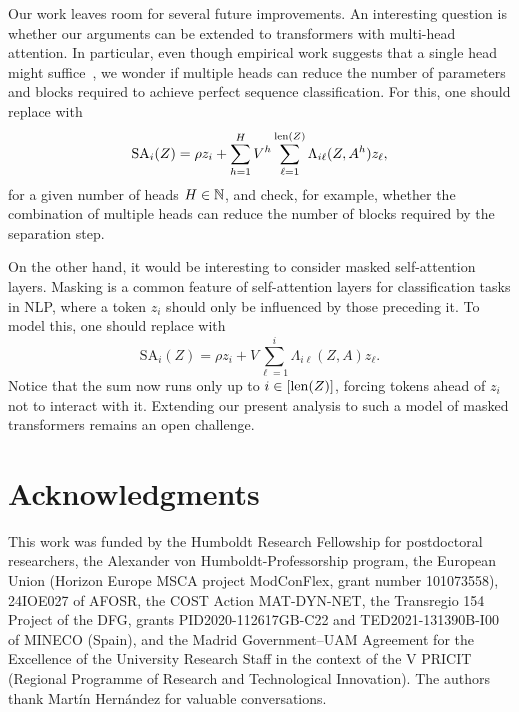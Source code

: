 \documentclass[11pt,a4paper]{amsart}
\begin{document}
Our work leaves room for several future improvements. An interesting question is whether our arguments can be extended to transformers with multi-head attention. In particular, even though empirical work suggests that a single head might suffice~\cite{michel2019sixteen}, we wonder if multiple heads can reduce the number of parameters and blocks required to achieve perfect sequence classification. For this, one should replace  with
\begin{equation}
    \mathrm{SA}_i(Z) = \rho z_i + \sum_{h=1}^H V^h \sum_{\ell = 1}^{\operatorname{len}(Z)} \Lambda_{i\ell}(Z,A^h)z_\ell,
\end{equation}
for a given number of heads $H\in \mathbb{N}$, and check, for example, whether the combination of multiple heads can reduce the number of blocks required by the separation step. 

On the other hand, it would be interesting to consider masked self-attention layers. Masking is a common feature of self-attention layers for classification tasks in NLP, where a token $z_i$ should only be influenced by those preceding it. To model this, one should replace  with
\begin{equation}
    \mathrm{SA}_i(Z) = \rho z_i + V \sum_{\ell = 1}^i \Lambda_{i\ell}(Z,A)z_\ell.
\end{equation}
Notice that the sum now runs only up to $i\in [\operatorname{len} (Z)]$, forcing tokens ahead of $z_i$ not to interact with it. 
Extending our present analysis to such a model of masked transformers remains an open challenge.
%
\section*{Acknowledgments}
This work was funded by the Humboldt Research
Fellowship for postdoctoral researchers, the Alexander von Humboldt-Professorship program, the European Union (Horizon Europe MSCA project ModConFlex, grant number 101073558), 24IOE027 of AFOSR, the COST Action MAT-DYN-NET, the Transregio 154 Project of the DFG, grants PID2020-112617GB-C22 and TED2021-131390B-I00 of MINECO (Spain), and the Madrid Government--UAM Agreement for the Excellence of the University Research Staff in the context of the V PRICIT (Regional Programme of Research and Technological Innovation). The authors thank Martín Hernández for valuable conversations.
%
  

\vfill
\end{document}
